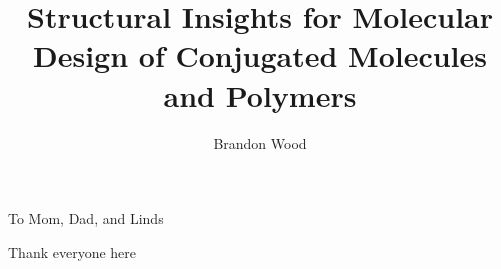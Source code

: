 \documentclass{ucbthesis}
\begin{document}

\title{Structural Insights for Molecular Design of Conjugated Molecules and Polymers}
\author{Brandon Wood}




\maketitle
\approvalpage
\copyrightpage



\begin{frontmatter}

\begin{dedication}
\null\vfil
\begin{center}
To Mom, Dad, and Linds\\\vspace{12pt}
\end{center}
\vfil\null
\end{dedication}


\tableofcontents
\clearpage
\listoffigures
\clearpage
\listoftables

\begin{acknowledgements}
Thank everyone here

\end{acknowledgements}

\end{frontmatter}
\end{document}
